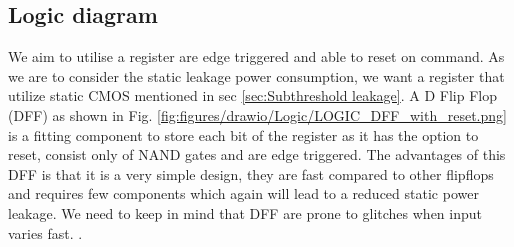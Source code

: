 \subsection{Logic diagram}


We aim to utilise a register are edge triggered and able to reset on command. As we are to consider the static leakage power consumption, we want a register that utilize static CMOS mentioned in sec \ref{sec:Subthreshold leakage}. A D Flip Flop (DFF) as shown in Fig. \ref{fig:figures/drawio/Logic/LOGIC_DFF_with_reset.png} is a fitting component to store each bit of the register as it has the option to reset, consist only of NAND gates and are edge triggered. The advantages of this DFF is that it is a very simple design, they are fast compared to other flipflops and requires few components which again will lead to a reduced static power leakage. We need to keep in mind that DFF are prone to glitches when input varies fast. \cite{a2023_d}.
